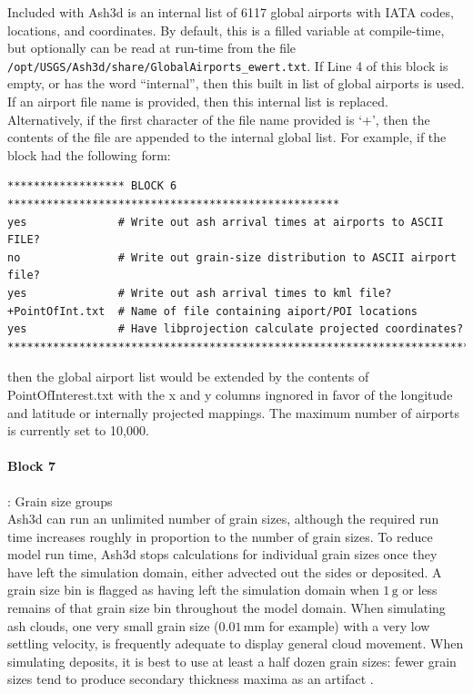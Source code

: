 Included with Ash3d is an internal list of 6117 global airports with IATA codes,
locations, and coordinates.  By default, this is a filled variable at compile-time,
but optionally can be read at run-time from the
file \texttt{/opt/USGS/Ash3d/share/GlobalAirports\_ewert.txt}.  If Line 4 of this
block is empty, or has the word ``internal'', then this built in list of global
airports is used.  If an airport file name is provided, then this internal list
is replaced.  Alternatively, if the first character of the file name provided is
`+', then the contents of the file are appended to the internal global list.  For
example, if the block had the following form:
\small
\begin{verbatim}
****************** BLOCK 6 ***************************************************
yes              # Write out ash arrival times at airports to ASCII FILE?
no               # Write out grain-size distribution to ASCII airport file?
yes              # Write out ash arrival times to kml file?
+PointOfInt.txt  # Name of file containing aiport/POI locations
yes              # Have libprojection calculate projected coordinates?
*******************************************************************************
\end{verbatim}
\normalsize
then the global airport list would be extended by the contents of PointOfInterest.txt
with the x and y columns ingnored in favor of the longitude and latitude or
internally projected mappings.  The maximum number of airports is currently set
to 10,000.

\paragraph{Block 7}: Grain size groups\\
Ash3d can run an unlimited number of grain sizes, although the required run time
increases roughly in proportion to the number of grain sizes. To reduce model run
time, Ash3d stops calculations for individual grain sizes once they have left the
simulation domain, either advected out the sides or deposited.  A grain size bin is
flagged as having left the simulation domain when $1 \, \mathrm{g}$ or less remains of
that grain size bin throughout the model domain.
When simulating ash clouds, one very small grain size ($0.01 \, \mathrm{mm}$ for
example) with a
very low settling velocity, is frequently adequate to display general cloud movement.
When simulating deposits, it is best to use at least a half dozen grain sizes: fewer
grain sizes tend to produce secondary thickness maxima as an artifact
\cite{Mastin12}.

